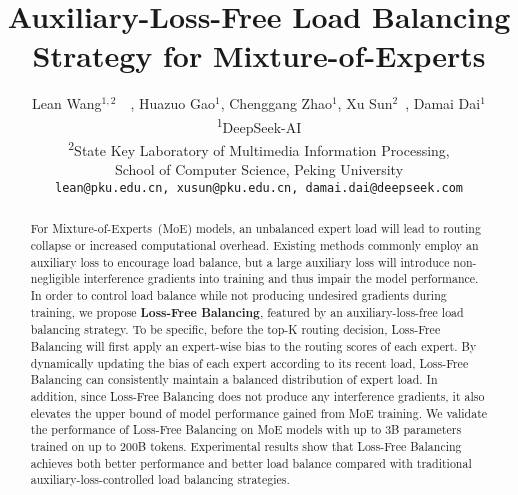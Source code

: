 \documentclass{article} %
\title{Auxiliary-Loss-Free Load Balancing 
Strategy for Mixture-of-Experts}
\author{Lean Wang$^{1,2}$\thanksA{~Contribution during internship at DeepSeek-AI.}~~, Huazuo Gao$^{1}$, Chenggang Zhao$^{1}$, Xu Sun$^{2}$\footnotemark[2]~, Damai Dai$^{1}$\thanksB{~Corresponding author.}\\
\textsuperscript{1}{DeepSeek-AI}\\
\textsuperscript{2}{State Key Laboratory of Multimedia Information Processing,}\\ {School of Computer Science, Peking University}\\
\texttt{{lean@pku.edu.cn, xusun@pku.edu.cn, damai.dai@deepseek.com}}
}
\newcommand{\ours}{Loss-Free Balancing}
\begin{document}
\maketitle

\begin{abstract}

For Mixture-of-Experts~(MoE) models, an unbalanced expert load will lead to routing collapse or increased computational overhead. 
Existing methods commonly employ an auxiliary loss to encourage load balance, but a large auxiliary loss will introduce non-negligible interference gradients into training and thus impair the model performance. 
In order to control load balance while not producing undesired gradients during training, we propose \textbf{\ours{}}, featured by an auxiliary-loss-free load balancing strategy. 
To be specific, before the top-K routing decision, \ours{} will first apply an expert-wise bias to the routing scores of each expert.
By dynamically updating the bias of each expert according to its recent load, \ours{} can consistently maintain a balanced distribution of expert load.
In addition, since \ours{} does not produce any interference gradients, it also elevates the upper bound of model performance gained from MoE training.
We validate the performance of \ours{} on MoE models with up to 3B parameters trained on up to 200B tokens.
Experimental results show that \ours{} achieves both better performance and better load balance compared with traditional auxiliary-loss-controlled load balancing strategies. 


\end{abstract}
\end{document}
